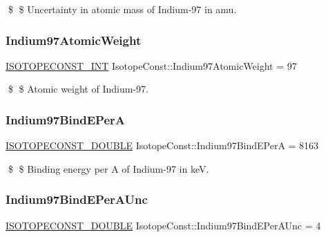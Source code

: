 \$ \$ Uncertainty in atomic mass of Indium-\/97 in amu. \mbox{\label{group___isotope_const-_indium-_in97_gaf8a1f3bafd9a23a47f6ab4950b45c680}} 
\subsubsection{\texorpdfstring{Indium97\+Atomic\+Weight}{Indium97AtomicWeight}}
{\footnotesize\ttfamily \mbox{\hyperlink{group___isotope_const-_macros_ga5f18360b3e99483a35c32d789e62621c}{I\+S\+O\+T\+O\+P\+E\+C\+O\+N\+S\+T\+\_\+\+I\+NT}} Isotope\+Const\+::\+Indium97\+Atomic\+Weight = 97}

\$ \$ Atomic weight of Indium-\/97. \mbox{\label{group___isotope_const-_indium-_in97_ga529d1edf4b64b6de683858d881ec7214}} 
\subsubsection{\texorpdfstring{Indium97\+Bind\+E\+PerA}{Indium97BindEPerA}}
{\footnotesize\ttfamily \mbox{\hyperlink{group___isotope_const-_macros_ga8f45a7272ce02c0b4c65c44636ed719a}{I\+S\+O\+T\+O\+P\+E\+C\+O\+N\+S\+T\+\_\+\+D\+O\+U\+B\+LE}} Isotope\+Const\+::\+Indium97\+Bind\+E\+PerA = 8163}

\$ \$ Binding energy per A of Indium-\/97 in keV. \mbox{\label{group___isotope_const-_indium-_in97_gab78c7b47a3992c1679284d366eb6a995}} 
\subsubsection{\texorpdfstring{Indium97\+Bind\+E\+Per\+A\+Unc}{Indium97BindEPerAUnc}}
{\footnotesize\ttfamily \mbox{\hyperlink{group___isotope_const-_macros_ga8f45a7272ce02c0b4c65c44636ed719a}{I\+S\+O\+T\+O\+P\+E\+C\+O\+N\+S\+T\+\_\+\+D\+O\+U\+B\+LE}} Isotope\+Const\+::\+Indium97\+Bind\+E\+Per\+A\+Unc = 4}

